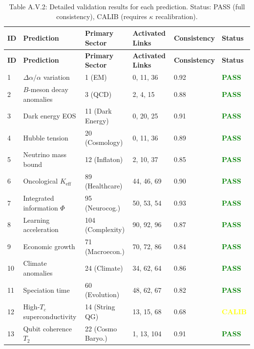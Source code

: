 \documentclass[13pt,a4paper]{article}
\begin{document}
	\begin{longtable}{|p{0.8cm}|p{2.5cm}|p{1.8cm}|p{1.5cm}|p{1.5cm}|p{1.8cm}|}
		\caption{Table A.V.2: Detailed validation results for each prediction. Status: PASS (full consistency), CALIB (requires $\kappa$ recalibration).}
		\label{tab:detailed-validation} \\
		\hline
		\textbf{ID} & \textbf{Prediction} & \textbf{Primary Sector} & \textbf{Activated Links} & \textbf{Consistency} & \textbf{Status} \\
		\hline
		\endfirsthead
		\hline
		\textbf{ID} & \textbf{Prediction} & \textbf{Primary Sector} & \textbf{Activated Links} & \textbf{Consistency} & \textbf{Status} \\
		\hline
		\endhead
		1 & $\Delta\alpha/\alpha$ variation & 1 (EM) & 0, 11, 36 & 0.92 & \textcolor{green}{\textbf{PASS}} \\
		\hline
		2 & $B$-meson decay anomalies & 3 (QCD) & 2, 4, 15 & 0.88 & \textcolor{green}{\textbf{PASS}} \\
		\hline
		3 & Dark energy EOS & 11 (Dark Energy) & 0, 20, 25 & 0.91 & \textcolor{green}{\textbf{PASS}} \\
		\hline
		4 & Hubble tension & 20 (Cosmology) & 0, 11, 36 & 0.89 & \textcolor{green}{\textbf{PASS}} \\
		\hline
		5 & Neutrino mass bound & 12 (Inflaton) & 2, 10, 37 & 0.85 & \textcolor{green}{\textbf{PASS}} \\
		\hline
		6 & Oncological $K_{\mathrm{eff}}$ & 89 (Healthcare) & 44, 46, 69 & 0.90 & \textcolor{green}{\textbf{PASS}} \\
		\hline
		7 & Integrated information $\Phi$ & 95 (Neurocog.) & 50, 53, 54 & 0.93 & \textcolor{green}{\textbf{PASS}} \\
		\hline
		8 & Learning acceleration & 104 (Complexity) & 90, 92, 96 & 0.87 & \textcolor{green}{\textbf{PASS}} \\
		\hline
		9 & Economic growth & 71 (Macroecon.) & 70, 72, 86 & 0.84 & \textcolor{green}{\textbf{PASS}} \\
		\hline
		10 & Climate anomalies & 24 (Climate) & 34, 62, 64 & 0.86 & \textcolor{green}{\textbf{PASS}} \\
		\hline
		11 & Speciation time & 60 (Evolution) & 48, 62, 67 & 0.82 & \textcolor{green}{\textbf{PASS}} \\
		\hline
		12 & High-$T_c$ superconductivity & 14 (String QG) & 13, 15, 68 & 0.68 & \textcolor{yellow}{\textbf{CALIB}} \\
		\hline
		13 & Qubit coherence $T_2$ & 22 (Cosmo Baryo.) & 1, 13, 104 & 0.91 & \textcolor{green}{\textbf{PASS}} \\

\end{longtable}
\end{document}
